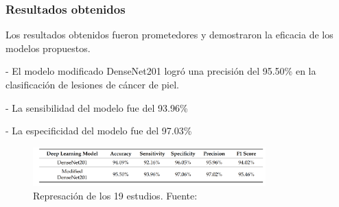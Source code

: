 \subsubsection{Resultados obtenidos}
Los resultados obtenidos fueron prometedores y demostraron la eficacia de los modelos propuestos.

- El modelo modificado DenseNet201 logró una precisión del 95.50\% en la clasificación de lesiones de cáncer de piel.

- La sensibilidad del modelo fue del 93.96\%

- La especificidad del modelo fue del 97.03\%



\begin{figure}[h]
	\begin{center}
		\includegraphics[width=0.8\textwidth]{2/figuras/resultado_ultimo.png}
		\caption{Represación de los 19 estudios. Fuente: \cite{goceri2023classification}}
		\label{1:fig 4}
	\end{center}
\end{figure}



